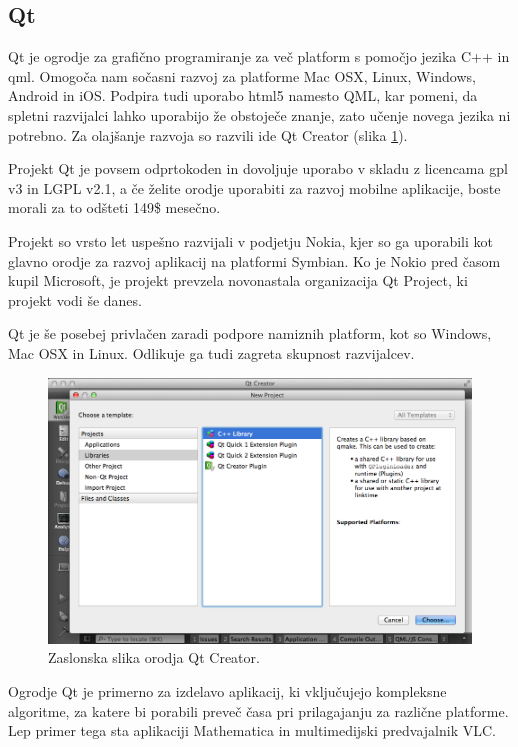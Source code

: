 \subsection{Qt}

Qt\cite{qt} je ogrodje za grafično programiranje za več platform s pomočjo jezika C++ in \gls{qml}. Omogoča nam sočasni razvoj za platforme Mac OSX, Linux, Windows, Android in iOS. Podpira tudi uporabo \gls{html5} namesto QML, kar pomeni, da spletni razvijalci lahko uporabijo že obstoječe znanje, zato učenje novega jezika ni potrebno. Za olajšanje razvoja so razvili \gls{ide} Qt Creator (slika \ref{fig:qt-creator}).

Projekt Qt je povsem odprtokoden in dovoljuje uporabo v skladu z licencama \gls{gpl} v3\cite{gpl} in LGPL v2.1\cite{lgpl}, a če želite orodje uporabiti za razvoj mobilne aplikacije, boste morali za to odšteti 149\$ mesečno.

Projekt so vrsto let uspešno razvijali v podjetju Nokia, kjer so ga uporabili kot glavno orodje za razvoj aplikacij na platformi Symbian. Ko je Nokio pred časom kupil Microsoft, je projekt prevzela novonastala organizacija Qt Project, ki projekt vodi še danes.

Qt je še posebej privlačen zaradi podpore namiznih platform, kot so Windows, Mac OSX in Linux. Odlikuje ga tudi zagreta skupnost razvijalcev.

\begin{figure}
 \includegraphics[width=\linewidth]{qt-creator}
 \caption{Zaslonska slika orodja Qt Creator.}
 \label{fig:qt-creator}
\end{figure}

Ogrodje Qt je primerno za izdelavo aplikacij, ki vključujejo kompleksne algoritme, za katere bi porabili preveč časa pri prilagajanju za različne platforme. Lep primer tega sta aplikaciji Mathematica\cite{mathematica} in multimedijski predvajalnik VLC\cite{vlc}.

